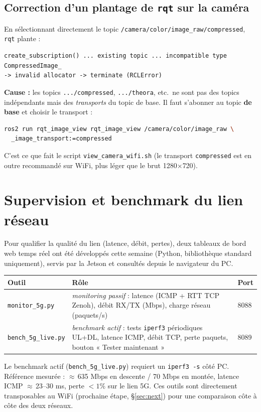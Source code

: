 \documentclass[a4paper,11pt]{article}
\begin{document}
\subsection{Correction d'un plantage de \texttt{rqt} sur la caméra}
En sélectionnant directement le topic \texttt{/camera/color/image\_raw/compressed},
\texttt{rqt} plante :
\begin{lstlisting}
create_subscription() ... existing topic ... incompatible type CompressedImage_
-> invalid allocator -> terminate (RCLError)
\end{lstlisting}
\textbf{Cause :} les topics \texttt{.../compressed}, \texttt{.../theora}, etc.\ ne
sont pas des topics indépendants mais des \emph{transports} du topic de base. Il
faut s'abonner au topic \textbf{de base} et choisir le transport :
\begin{lstlisting}[language=bash]
ros2 run rqt_image_view rqt_image_view /camera/color/image_raw \
  _image_transport:=compressed
\end{lstlisting}
C'est ce que fait le script \texttt{view\_camera\_wifi.sh} (le transport
\texttt{compressed} est en outre recommandé sur WiFi, plus léger que le brut
1280$\times$720).

\section{Supervision et benchmark du lien réseau}
Pour qualifier la qualité du lien (latence, débit, pertes), deux tableaux de bord
web temps réel ont été développés cette semaine (Python, bibliothèque standard
uniquement), servis par la Jetson et consultés depuis le navigateur du PC.
\begin{table}[H]
\centering
\begin{tabularx}{\textwidth}{@{}l X l@{}}
\toprule
\textbf{Outil} & \textbf{Rôle} & \textbf{Port} \\
\midrule
\texttt{monitor\_5g.py}   & \emph{monitoring passif} : latence (ICMP + RTT TCP Zenoh), débit RX/TX (Mbps), charge réseau (paquets/s) & 8088 \\
\texttt{bench\_5g\_live.py} & \emph{benchmark actif} : tests \texttt{iperf3} périodiques UL+DL, latence ICMP, débit TCP, perte paquets, bouton « Tester maintenant » & 8089 \\
\bottomrule
\end{tabularx}
\end{table}
\noindent Le benchmark actif (\texttt{bench\_5g\_live.py}) requiert un
\texttt{iperf3 -s} côté PC. Référence mesurée : $\approx$\,635 Mbps en descente /
70 Mbps en montée, latence ICMP $\approx$\,23--30 ms, perte $<1\%$ sur le lien 5G.
Ces outils sont directement transposables au WiFi (prochaine étape, §\ref{sec:next})
pour une comparaison côte à côte des deux réseaux.
\end{document}
